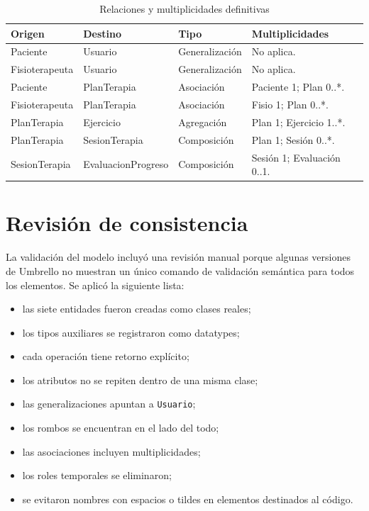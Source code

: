 \begin{table}[H]
\centering
\caption{Relaciones y multiplicidades definitivas}
\begin{tabularx}{\textwidth}{L{3.7cm}L{3.7cm}L{3.1cm}X}
\toprule
\textbf{Origen} & \textbf{Destino} & \textbf{Tipo} & \textbf{Multiplicidades} \\
\midrule
Paciente & Usuario & Generalización & No aplica. \\
Fisioterapeuta & Usuario & Generalización & No aplica. \\
Paciente & PlanTerapia & Asociación & Paciente 1; Plan 0..*. \\
Fisioterapeuta & PlanTerapia & Asociación & Fisio 1; Plan 0..*. \\
PlanTerapia & Ejercicio & Agregación & Plan 1; Ejercicio 1..*. \\
PlanTerapia & SesionTerapia & Composición & Plan 1; Sesión 0..*. \\
SesionTerapia & EvaluacionProgreso & Composición & Sesión 1; Evaluación 0..1. \\
\bottomrule
\end{tabularx}
\end{table}

\section{Revisión de consistencia}
La validación del modelo incluyó una revisión manual porque algunas versiones de Umbrello no muestran un único comando de validación semántica para todos los elementos. Se aplicó la siguiente lista:
\begin{itemize}
  \item las siete entidades fueron creadas como clases reales;
  \item los tipos auxiliares se registraron como datatypes;
  \item cada operación tiene retorno explícito;
  \item los atributos no se repiten dentro de una misma clase;
  \item las generalizaciones apuntan a \texttt{Usuario};
  \item los rombos se encuentran en el lado del todo;
  \item las asociaciones incluyen multiplicidades;
  \item los roles temporales se eliminaron;
  \item se evitaron nombres con espacios o tildes en elementos destinados al código.
\end{itemize}

